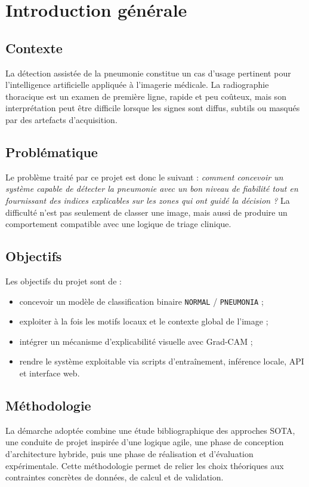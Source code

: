\documentclass[a4paper,11pt,oneside]{report}
\begin{document}
\chapter*{Introduction générale}
\section{Contexte}
La détection assistée de la pneumonie constitue un cas d'usage pertinent pour l'intelligence artificielle appliquée à l'imagerie médicale. La radiographie thoracique est un examen de première ligne, rapide et peu coûteux, mais son interprétation peut être difficile lorsque les signes sont diffus, subtils ou masqués par des artefacts d’acquisition.

\section{Problématique}
Le problème traité par ce projet est donc le suivant : \textit{comment concevoir un système capable de détecter la pneumonie avec un bon niveau de fiabilité tout en fournissant des indices explicables sur les zones qui ont guidé la décision ?} La difficulté n’est pas seulement de classer une image, mais aussi de produire un comportement compatible avec une logique de triage clinique.

\section{Objectifs}
Les objectifs du projet sont de :
\begin{itemize}
\item concevoir un modèle de classification binaire \texttt{NORMAL} / \texttt{PNEUMONIA} ;
\item exploiter à la fois les motifs locaux et le contexte global de l’image ;
\item intégrer un mécanisme d’explicabilité visuelle avec Grad-CAM ;
\item rendre le système exploitable via scripts d’entraînement, inférence locale, API et interface web.
\end{itemize}

\section{Méthodologie}
La démarche adoptée combine une étude bibliographique des approches SOTA, une conduite de projet inspirée d’une logique agile, une phase de conception d’architecture hybride, puis une phase de réalisation et d’évaluation expérimentale. Cette méthodologie permet de relier les choix théoriques aux contraintes concrètes de données, de calcul et de validation.
\end{document}
